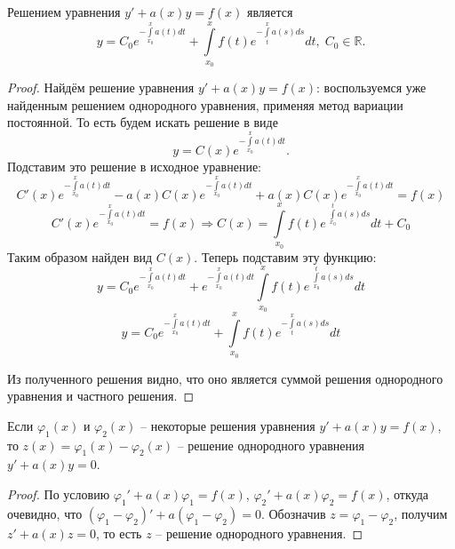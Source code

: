 \begin{proposition}
    Решением уравнения $y' + a(x) y = f(x)$ является
    \begin{equation}
        y = C_0 e^{-\int\limits_{x_0}^{x} a(t) dt} + \int\limits_{x_0}^{x} f(t) e^{- \int\limits_{t}^{x} a(s) ds} dt, \; C_0 \in \mathbb{R}.
    \end{equation}
\end{proposition}

\begin{proof}
    Найдём решение уравнения $y' + a(x) y = f(x)$: воспользуемся уже найденным решением однородного уравнения, применяя метод вариации постоянной. То есть будем искать решение в виде
    \begin{equation}
        y = C(x) e^{-\int\limits_{x_0}^{x} a(t) dt}.
    \end{equation}
    Подставим это решение в исходное уравнение:
    \begin{equation}
        C'(x) e^{-\int\limits_{x_0}^{x} a(t) dt} - a(x) C(x) e^{-\int\limits_{x_0}^{x} a(t) dt} + a(x) C(x) e^{-\int\limits_{x_0}^{x} a(t) dt} = f(x)
    \end{equation}
    \begin{equation}
        C'(x) e^{-\int\limits_{x_0}^{x} a(t) dt} = f(x) \Rightarrow C(x) = \int\limits_{x_0}^{x} f(t) e^{\; \int\limits_{x_0}^{t} a(s) ds} dt + C_0 
    \end{equation}
    Таким образом найден вид $C(x)$. Теперь подставим эту функцию:
    \begin{equation}
        y = C_0 e^{-\int\limits_{x_0}^{x} a(t) dt} + e^{-\int\limits_{x_0}^{x} a(t) dt} \int\limits_{x_0}^{x} f(t) e^{\; \int\limits_{x_0}^{t} a(s) ds} dt
    \end{equation}
    \begin{equation}
        y = C_0 e^{-\int\limits_{x_0}^{x} a(t) dt} + \int\limits_{x_0}^{x} f(t) e^{- \int\limits_{t}^{x} a(s) ds} dt
    \end{equation}
    
    Из полученного решения видно, что оно является суммой решения однородного уравнения и частного решения. 
\end{proof}

\begin{proposition}
    Если $\varphi_1(x)$ и $\varphi_2(x)$ -- некоторые решения уравнения $y' + a(x) y = f(x)$, то $z(x) = \varphi_1(x) - \varphi_2(x)$ -- решение однородного уравнения $y' + a(x) y = 0$.
\end{proposition}

\begin{proof}
    По условию $\varphi_1' + a(x) \varphi_1 = f(x)$, $\varphi_2' + a(x) \varphi_2 = f(x)$, откуда очевидно, что $(\varphi_1 - \varphi_2)' + a (\varphi_1 - \varphi_2) = 0$. Обозначив $z = \varphi_1 - \varphi_2$, получим $z' + a(x) z = 0$, то есть $z$ -- решение однородного уравнения.
\end{proof}
